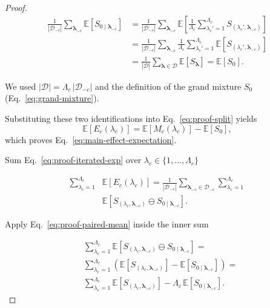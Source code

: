 \begin{proof}
{\small
\begin{align}
\frac{1}{|\mathcal{D}_{-c}|}\sum_{\boldsymbol{\lambda}_{-c}}
\mathbb{E}\!\left[S_{0\mid \boldsymbol{\lambda}_{-c}}\right]
&=
\frac{1}{|\mathcal{D}_{-c}|}\sum_{\boldsymbol{\lambda}_{-c}}
\mathbb{E}\!\left[
\frac{1}{\Lambda_c}\sum_{\lambda_c'=1}^{\Lambda_c}
S_{(\lambda_c',\boldsymbol{\lambda}_{-c})}
\right] \\
&=
\frac{1}{|\mathcal{D}_{-c}|}\sum_{\boldsymbol{\lambda}_{-c}}
\frac{1}{\Lambda_c}\sum_{\lambda_c'=1}^{\Lambda_c}
\mathbb{E}\!\left[S_{(\lambda_c',\boldsymbol{\lambda}_{-c})}\right] \\
&=
\frac{1}{|\mathcal{D}|}\sum_{\boldsymbol{\lambda}\in\mathcal{D}}
\mathbb{E}\!\left[S_{\boldsymbol{\lambda}}\right]
=
\mathbb{E}[S_0].
\end{align}
}

We used $|\mathcal{D}|=\Lambda_c\,|\mathcal{D}_{-c}|$ and the definition of
the grand mixture $S_0$ (Eq.~\eqref{eq:grand-mixture}).

Substituting these two identifications into Eq.~\eqref{eq:proof-split} yields
\[
\mathbb{E}\!\left[E_c(\lambda_c)\right]
=
\mathbb{E}\!\left[M_c(\lambda_c)\right]
-
\mathbb{E}\!\left[S_0\right],
\]
which proves Eq.~\eqref{eq:main-effect-expectation}.

Sum Eq.~\eqref{eq:proof-iterated-exp} over $\lambda_c\in\{1,\dots,\Lambda_c\}$

{\small
\begin{align}
\sum_{\lambda_c=1}^{\Lambda_c} &\mathbb{E}\!\left[E_c(\lambda_c)\right]
=
\frac{1}{|\mathcal{D}_{-c}|}
\sum_{\boldsymbol{\lambda}_{-c}\in\mathcal{D}_{-c}}
\sum_{\lambda_c=1}^{\Lambda_c} \\
&\mathbb{E}\!\left[
S_{(\lambda_c,\boldsymbol{\lambda}_{-c})}\ominus S_{0\mid \boldsymbol{\lambda}_{-c}}
\right].
\end{align}
}

Apply Eq.~\eqref{eq:proof-paired-mean} inside the inner sum

{\small
\begin{align}
&\sum_{\lambda_c=1}^{\Lambda_c}
\mathbb{E}\!\left[
S_{(\lambda_c,\boldsymbol{\lambda}_{-c})}\ominus S_{0\mid \boldsymbol{\lambda}_{-c}}
\right]
= \\
&\sum_{\lambda_c=1}^{\Lambda_c}
\left(
\mathbb{E}[S_{(\lambda_c,\boldsymbol{\lambda}_{-c})}] 
-
\mathbb{E}[S_{0\mid \boldsymbol{\lambda}_{-c}}]
\right)
= \\
&\sum_{\lambda_c=1}^{\Lambda_c}\mathbb{E}[S_{(\lambda_c,\boldsymbol{\lambda}_{-c})}]
-
\Lambda_c \,\mathbb{E}[S_{0\mid \boldsymbol{\lambda}_{-c}}].
\end{align}
}


\end{proof}
